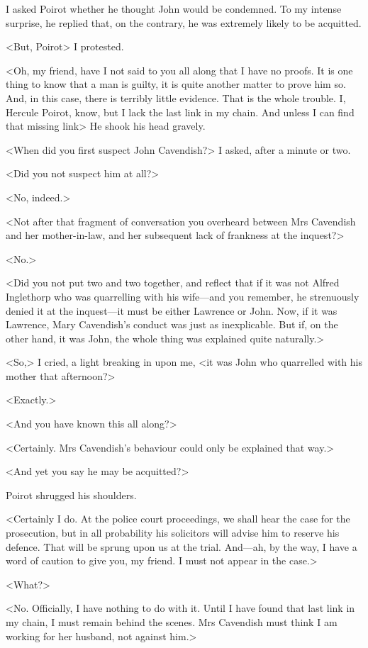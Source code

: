  I asked Poirot whether he thought John would be condemned. To my intense surprise, he replied that, on the contrary, he was extremely likely to be acquitted. 

 <But, Poirot\longdash> I protested. 

 <Oh, my friend, have I not said to you all along that I have no proofs. It is one thing to know that a man is guilty, it is quite another matter to prove him so. And, in this case, there is terribly little evidence. That is the whole trouble. I, Hercule Poirot, know, but I lack the last link in my chain. And unless I can find that missing link\longdash> He shook his head gravely. 

 <When did you first suspect John Cavendish?> I asked, after a minute or two. 

 <Did you not suspect him at all?> 

 <No, indeed.> 

 <Not after that fragment of conversation you overheard between Mrs Cavendish and her mother-in-law, and her subsequent lack of frankness at the inquest?> 

 <No.> 

 <Did you not put two and two together, and reflect that if it was not Alfred Inglethorp who was quarrelling with his wife—and you remember, he strenuously denied it at the inquest—it must be either Lawrence or John. Now, if it was Lawrence, Mary Cavendish's conduct was just as inexplicable. But if, on the other hand, it was John, the whole thing was explained quite naturally.> 

 <So,> I cried, a light breaking in upon me, <it was John who quarrelled with his mother that afternoon?> 

 <Exactly.> 

 <And you have known this all along?> 

 <Certainly. Mrs Cavendish's behaviour could only be explained that way.> 

 <And yet you say he may be acquitted?> 

 Poirot shrugged his shoulders. 

 <Certainly I do. At the police court proceedings, we shall hear the case for the prosecution, but in all probability his solicitors will advise him to reserve his defence. That will be sprung upon us at the trial. And—ah, by the way, I have a word of caution to give you, my friend. I must not appear in the case.> 

 <What?> 

 <No. Officially, I have nothing to do with it. Until I have found that last link in my chain, I must remain behind the scenes. Mrs Cavendish must think I am working for her husband, not against him.> 

